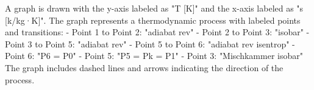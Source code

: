A graph is drawn with the y-axis labeled as "T [K]" and the x-axis labeled as "s [k/kg·K]". The graph represents a thermodynamic process with labeled points and transitions:  
- Point 1 to Point 2: "adiabat rev"  
- Point 2 to Point 3: "isobar"  
- Point 3 to Point 5: "adiabat rev"  
- Point 5 to Point 6: "adiabat rev isentrop"  
- Point 6: "P6 = P0"  
- Point 5: "P5 = Pk = P1"  
- Point 3: "Mischkammer isobar"  
The graph includes dashed lines and arrows indicating the direction of the process.